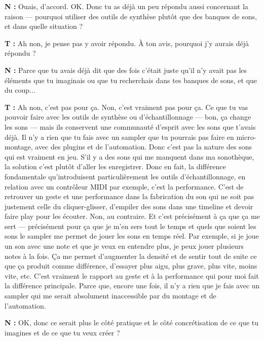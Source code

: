 ﻿\documentclass[12pt]{article}
\begin{document}
\textbf{N :} Ouais, d'accord. OK. Donc tu as déjà un peu répondu aussi concernant la raison — pourquoi utiliser des outils de synthèse plutôt que des banques de sons, et dans quelle situation ? 

\textbf{T :} Ah non, je pense pas y avoir répondu. À ton avis, pourquoi j'y aurais déjà répondu ? 

\textbf{N :} Parce que tu avais déjà dit que des fois c'était juste qu'il n'y avait pas les éléments que tu imaginais ou que tu recherchais dans tes banques de sons, et que du coup... 

\textbf{T :} Ah non, c'est pas pour ça. Non, c'est vraiment pas pour ça. Ce que tu vas pouvoir faire avec les outils de synthèse ou d'échantillonnage — bon, ça change les sons — mais ils conservent une communauté d'esprit avec les sons que t'avais déjà. Il n'y a rien que tu fais avec un sampler que tu pourrais pas faire en micro-montage, avec des plugins et de l'automation. Donc c'est pas la nature des sons qui est vraiment en jeu. S'il y a des sons qui me manquent dans ma sonothèque, la solution c'est plutôt d'aller les enregistrer. 
Donc en fait, la différence fondamentale qu'introduisent particulièrement les outils d'échantillonnage, en relation avec un contrôleur MIDI par exemple, c'est la performance. C'est de retrouver un geste et une performance dans la fabrication du son qui ne soit pas justement celle du cliquer-glisser, d'empiler des sons dans une timeline et devoir faire play pour les écouter. Non, au contraire. Et c'est précisément à ça que ça me sert — précisément pour ça que je m'en sers tout le temps et quels que soient les sons le sampler me permet de jouer les sons en temps réel. Par exemple, si je joue un son avec une note et que je veux en entendre plus, je peux jouer plusieurs notes à la fois. Ça me permet d'augmenter la densité et de sentir tout de suite ce que ça produit comme différence, d'essayer plus aigu, plus grave, plus vite, moins vite, etc. C'est vraiment le rapport au geste et à la performance qui pour moi fait la différence principale. Parce que, encore une fois, il n'y a rien que je fais avec un sampler qui me serait absolument inaccessible par du montage et de l'automation. 

\textbf{N :} OK, donc ce serait plus le côté pratique et le côté concrétisation de ce que tu imagines et de ce que tu veux créer ? 
\end{document}
